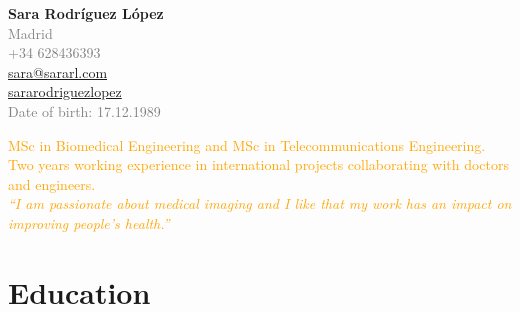 \documentclass[10pt,a4paper]{moderncv}
\begin{document}
\begin{minipage}{0.49\textwidth}
 
\begin{minipage}{0.33\textwidth}
{%
\setlength{\fboxsep}{2pt}%
\setlength{\fboxrule}{1pt}%
}%
\end{minipage}
\begin{minipage}{0.68\textwidth}
{\Large \textbf{Sara Rodríguez López}} \vspace{5pt} \\
\textcolor{gray}
{ 
 \addresssymbol Madrid \\
 \mobilesymbol +34 628436393 \\
 \emailsymbol \href{mailto:sara@sararl.com}{sara@sararl.com}  \\
 \linkedinsocialsymbol \href{http://es.linkedin.com/in/sararodriguezlopez}{sararodriguezlopez} \\ 
 Date of birth: 17.12.1989
 }

\end{minipage}
\end{minipage}
\hfill
\begin{minipage}{0.49\textwidth}
\centering
\textcolor{orange}{MSc in  Biomedical Engineering and MSc in Telecommunications Engineering. \\Two years working experience in international projects collaborating with doctors and engineers. \vspace{8pt} \\ \textit{``I am passionate about medical imaging and I like that my work has an impact on improving people's health.''}}
\end{minipage}
% 


\section{Education}
\end{document}
